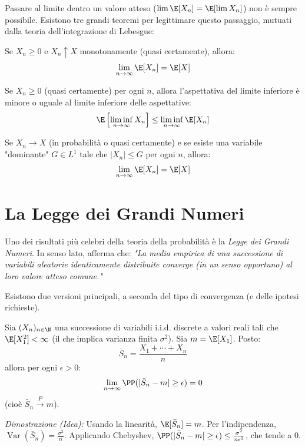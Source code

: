 Passare al limite dentro un valore atteso ($\lim \E[X_n] = \E[\lim X_n]$) non è sempre possibile. Esistono tre grandi teoremi per legittimare questo passaggio, mutuati dalla teoria dell'integrazione di Lebesgue:

\begin{theorem}
Se $X_n \ge 0$ e $X_n \uparrow X$ monotonamente (quasi certamente), allora:
\[ \lim_{n\to\infty} \E[X_n] = \E[X] \]
\end{theorem}

\begin{theorem}
Se $X_n \ge 0$ (quasi certamente) per ogni $n$, allora l'aspettativa del limite inferiore è minore o uguale al limite inferiore delle aspettative:
\[ \E\left[\liminf_{n\to\infty} X_n\right] \le \liminf_{n\to\infty} \E[X_n] \]
\end{theorem}

\begin{theorem}
Se $X_n \to X$ (in probabilità o quasi certamente) e se esiste una variabile "dominante" $G \in L^1$ tale che $|X_n| \le G$ per ogni $n$, allora:
\[ \lim_{n\to\infty} \E[X_n] = \E[X] \]
\end{theorem}

\section{La Legge dei Grandi Numeri}

Uno dei risultati più celebri della teoria della probabilità è la \emph{Legge dei Grandi Numeri}. In senso lato, afferma che:
\emph{"La media empirica di una successione di variabili aleatorie identicamente distribuite converge (in un senso opportuno) al loro valore atteso comune."}

Esistono due versioni principali, a seconda del tipo di convergenza (e delle ipotesi richieste).

\begin{theorem}
Sia $(X_n)_{n \in \N}$ una successione di variabili i.i.d. discrete a valori reali tali che $\E[X_1^2] < \infty$ (il che implica varianza finita $\sigma^2$). Sia $m = \E[X_1]$. Posto:
\[ \bar{S}_n = \frac{X_1 + \cdots + X_n}{n} \]
allora per ogni $\epsilon > 0$:
\[ \lim_{n\to\infty} \PP(|\bar{S}_n - m| \ge \epsilon) = 0 \]
(cioè $\bar{S}_n \stackrel{P}{\to} m$).
\end{theorem}
\emph{Dimostrazione (Idea):} Usando la linearità, $\E[\bar{S}_n] = m$. Per l'indipendenza, $\operatorname{Var}(\bar{S}_n) = \frac{\sigma^2}{n}$. Applicando Chebyshev, $\PP(|\bar{S}_n - m| \ge \epsilon) \le \frac{\sigma^2}{n\epsilon^2}$, che tende a 0.

